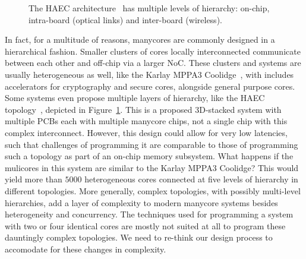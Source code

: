 \begin{figure}[h]
	\centering
   \resizebox{0.85\textwidth}{!}{}
   \caption{The \acs*{HAEC} architecture~\cite{HAEC} has multiple levels of hierarchy: on-chip, intra-board (optical links) and inter-board (wireless).} 
	\label{fig:haec}
\end{figure}

In fact, for a multitude of reasons, manycores are commonly designed in a hierarchical fashion.
Smaller clusters of cores locally interconnected communicate between each other and off-chip via a larger \ac{NoC}.
These clusters and systems are usually heterogeneous as well, like the Karlay MPPA3 Coolidge~\cite{coolidge}, with includes accelerators for cryptography and secure cores, alongside general purpose cores.
Some systems even propose multiple layers of hierarchy, like the \ac{HAEC} topology~\cite{HAEC}, depicted in Figure~\ref{fig:haec}.
This is a proposed 3D-stacked system with multiple \acp{PCB} each with multiple manycore chips, not a single chip with this complex interconnect.
However, this design could allow for very low latencies, such that challenges of programming it are comparable to those of programming such a topology as part of an on-chip memory subsystem.
What happens if the mulicores in this system are similar to the Karlay MPPA3 Coolidge? This would yield more than $5000$ heterogeneous cores connected at five levels of hierarchy in different topologies.
More generally, complex topologies, with possibly multi-level hierarchies, add a layer of complexity to modern manycore systems besides heterogeneity and concurrency.
The techniques used for programming a system with two or four identical cores are mostly not suited at all to program these dauntingly complex topologies.
We need to re-think our design process to accomodate for these changes in complexity.


